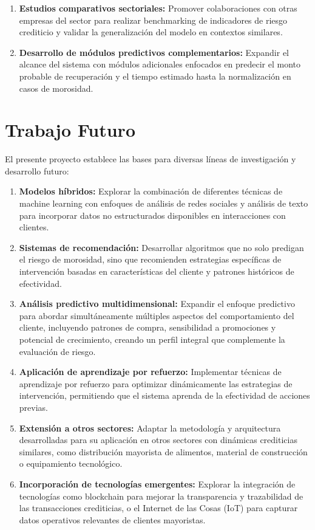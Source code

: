 \begin{enumerate}
    \item \textbf{Estudios comparativos sectoriales:} Promover colaboraciones con otras empresas del sector para realizar benchmarking de indicadores de riesgo crediticio y validar la generalización del modelo en contextos similares.
    
    \item \textbf{Desarrollo de módulos predictivos complementarios:} Expandir el alcance del sistema con módulos adicionales enfocados en predecir el monto probable de recuperación y el tiempo estimado hasta la normalización en casos de morosidad.
\end{enumerate}

\section{Trabajo Futuro}

El presente proyecto establece las bases para diversas líneas de investigación y desarrollo futuro:

\begin{enumerate}
    \item \textbf{Modelos híbridos:} Explorar la combinación de diferentes técnicas de machine learning con enfoques de análisis de redes sociales y análisis de texto para incorporar datos no estructurados disponibles en interacciones con clientes.
    
    \item \textbf{Sistemas de recomendación:} Desarrollar algoritmos que no solo predigan el riesgo de morosidad, sino que recomienden estrategias específicas de intervención basadas en características del cliente y patrones históricos de efectividad.
    
    \item \textbf{Análisis predictivo multidimensional:} Expandir el enfoque predictivo para abordar simultáneamente múltiples aspectos del comportamiento del cliente, incluyendo patrones de compra, sensibilidad a promociones y potencial de crecimiento, creando un perfil integral que complemente la evaluación de riesgo.
    
    \item \textbf{Aplicación de aprendizaje por refuerzo:} Implementar técnicas de aprendizaje por refuerzo para optimizar dinámicamente las estrategias de intervención, permitiendo que el sistema aprenda de la efectividad de acciones previas.
    
    \item \textbf{Extensión a otros sectores:} Adaptar la metodología y arquitectura desarrolladas para su aplicación en otros sectores con dinámicas crediticias similares, como distribución mayorista de alimentos, material de construcción o equipamiento tecnológico.
    
    \item \textbf{Incorporación de tecnologías emergentes:} Explorar la integración de tecnologías como blockchain para mejorar la transparencia y trazabilidad de las transacciones crediticias, o el Internet de las Cosas (IoT) para capturar datos operativos relevantes de clientes mayoristas.
\end{enumerate}

